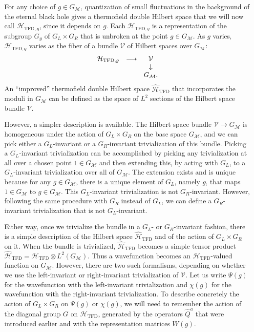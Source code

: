 \documentclass[11pt,a4paper]{article}
\def\be{\begin{equation}}
\def\ee{\end{equation}}
\def\h{\widehat}
\def\V{{\mathcal V}}
\def\h{\widehat}
\def\V{{\mathcal V}}
\def\M{{\mathcal M}}
\def\H{{\mathcal H}}
\def\TFD{{\mathrm{TFD}}}
\begin{document}
      
For any choice of $g\in G_\M$, quantization of small fluctuations in the background of the eternal black hole gives a thermofield double Hilbert space that we will
now call $\H_{\TFD,g}$, since it depends on $g$.  Each $\H_{\TFD,g}$ is a representation of the subgroup $G_g$ of $G_L\times G_R$ that is unbroken at
the point $g\in G_\M$.
 As $g$ varies, $\H_{\TFD,g}$ varies as the fiber of a bundle $\V$ of Hilbert spaces over $G_\M$:
\be\label{zolbo}\begin{matrix} \H_{\TFD,g} & \longrightarrow & \V\cr && \downarrow \cr && G_\M.\end{matrix}  \ee
An ``improved'' thermofield double Hilbert space $\h\H_\TFD$  that incorporates the moduli in $G_\M$ can be defined as the space of $L^2$ sections of the Hilbert space bundle $\V$.    

However, a simpler description is available.   The Hilbert space bundle $\V\to G_\M$ is homogeneous under the action of $G_L\times G_R$
on the base space $G_\M$, and we can pick either a $G_L$-invariant or a $G_R$-invariant trivialization of this  bundle.  Picking a $G_L$-invariant
trivialization can be accomplished by picking any trivialization at all over a chosen point $1\in G_\M$ and then extending this, by acting with $G_L$,
to a $G_L$-invariant trivialization over all of $G_\M$.  The extension exists and is unique because for any $g\in G_\M$, there is a unique element of $G_L$,
namely $g$, that maps $1\in G_\M$ to $g\in G_\M$.    This $G_L$-invariant trivialization is not $G_R$-invariant.   However, following the same procedure
with $G_R$ instead of $G_L$, we can define a $G_R$-invariant trivialization that is not $G_L$-invariant.

Either way, once we trivialize the bundle in a $G_L$- or $G_R$-invariant fashion, there is a simple description of the Hilbert space $\h\H_\TFD$ and of the
action of $G_L\times G_R$ on it.   When the bundle is trivialized, $\h\H_\TFD$ becomes a simple tensor product $\h\H_\TFD=\H_\TFD\otimes L^2(G_\M)$.
Thus a wavefunction becomes an $\H_\TFD$-valued function on $G_\M$.    However, there are two such  formalisms, depending on
whether we use the left-invariant or right-invariant trivialization of $\V$.  Let us write $\Psi(g)$ for the wavefunction with the left-invariant trivialization
and $\chi(g)$ for the wavefunction with the right-invariant trivialization.   To describe concretely the action of $G_L\times G_R$ on $\Psi(g)$ or $\chi(g)$,
we will need to remember  the action of the diagonal group $G$ on $\H_\TFD$, generated by the operators $\h Q^a$ that were introduced earlier
and with the representation matrices $W(g)$.   
\end{document}
